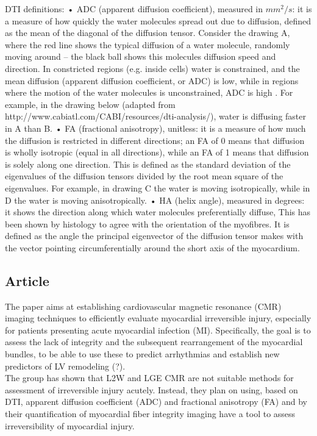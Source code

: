 DTI definitions:
• ADC (apparent diffusion coefficient), measured in $mm^2/s$: it is a measure of how quickly the water molecules spread out
due to diffusion, defined as the mean of the diagonal of the diffusion tensor. Consider the drawing A, where the red line shows the typical diffusion of a water molecule, randomly moving around – the black ball shows this molecules diffusion speed and direction. In constricted regions (e.g. inside cells) water is constrained, and the mean diffusion (apparent diffusion coefficient, or ADC) is low, while in regions where the motion of the water molecules is unconstrained, ADC is high . For example, in the drawing below (adapted from http://www.cabiatl.com/CABI/resources/dti-analysis/), water is diffusing faster in A than B.
• FA (fractional anisotropy), unitless: it is a measure of how much the diffusion is restricted in different directions; an FA of 0 means that diffusion is wholly isotropic (equal in all directions), while an FA of 1 means that diffusion is solely along one direction. This is defined as the standard deviation of the eigenvalues of the diffusion tensors divided by the root mean square of the eigenvalues. For example, in drawing C the water is moving isotropically, while
in D the water is moving anisotropically.
• HA (helix angle), measured in degrees: it shows the direction along which water molecules preferentially diffuse, This has been shown by histology to agree with the orientation of the myofibres. It is defined as the angle the principal eigenvector of the diffusion tensor makes with the vector pointing circumferentially around the short axis of the myocardium.


\subsection{Article}

The paper aims at establishing cardiovascular magnetic resonance (CMR) imaging techniques to efficiently evaluate myocardial irreversible injury, especially for patients presenting acute myocardial infection (MI).
Specifically, the goal is to assess the lack of integrity and the subsequent rearrangement of the myocardial bundles, to be able to use these to predict arrhythmias and establish new predictors of LV remodeling (?).\\
The group has shown that L2W and LGE CMR are not suitable methods for assessment of irreversible injury acutely. Instead, they plan on using, based on DTI, apparent diffusion coefficient (ADC) and fractional anisotropy (FA) and by their quantification of myocardial fiber integrity imaging have a tool to assess irreversibility of myocardial injury.\\


